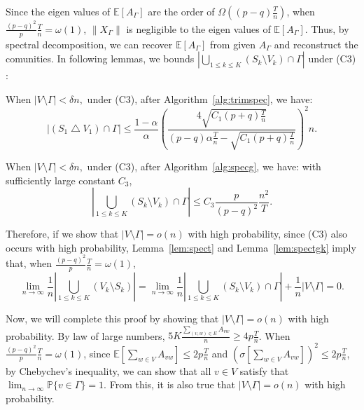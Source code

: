 Since the eigen values of
$\mathbb{E}[A_{\Gamma}]$ are the order of $\Omega((p-q)\frac{T}{n})$,
when $\frac{(p-q)^2}{p}\frac{T}{n}= \omega(1)$, $\|X_{\Gamma} \|$ is
negligible to the eigen values of $\mathbb{E}[A_{\Gamma}]$. Thus, by
spectral decomposition, we can recover $\mathbb{E}[A_{\Gamma}]$ from
given $A_\Gamma$ and reconstruct the comunities. In following lemmas, we bounds $|\bigcup_{1\le k \le K}(S_k \setminus
V_k)\cap \Gamma|$ under (C3) :  
\begin{lemma} When $|V \setminus \Gamma | < \delta n ,$ under (C3), after Algorithm~\ref{alg:trimspec}, we have:
$$
|(S_1 \bigtriangleup V_1)\cap \Gamma|  \le   \frac{1-\alpha}{\alpha}\left(\frac{4\sqrt{C_1 (p+q)\frac{T}{n}}}{(p-q)\alpha\frac{T}{n} - \sqrt{C_1 (p+q)\frac{T}{n}}}\right)^2 n.
$$
\label{lem:spect}
\end{lemma}
\begin{lemma} 
When $|V \setminus \Gamma | < \delta n ,$ under (C3), after
Algorithm~\ref{alg:specg}, we have: with sufficiently large constant $C_3$,
$$
|\bigcup_{1\le k \le K}(S_k \setminus V_k)\cap \Gamma|  \le   C_3 \frac{p}{(p-q)^2}\frac{n^2}{T}.
$$ \label{lem:spectgk}
\end{lemma}

Therefore, if we show that $|V\setminus \Gamma| = o(n)$ with high probability, since (C3)
also occurs with high probability, Lemma~\ref{lem:spect} and
Lemma~\ref{lem:spectgk} imply that, when $\frac{(p-
  q)^2}{p}\frac{T}{n} = \omega(1)$,
$$\lim_{n \to \infty} \frac{1}{n}|\bigcup_{1\le k \le K}(V_k \setminus
S_k)| = \lim_{n \to \infty} \frac{1}{n}|\bigcup_{1\le k \le K}(S_k \setminus
V_k)\cap \Gamma| +\frac{1}{n}|V \setminus \Gamma| = 0.$$

Now, we will complete this proof by showing that $|V\setminus \Gamma|
= o(n)$ with high probability. By law of large numbers, $5K
\frac{\sum_{(v,w) \in E } A_{vw}}{n} \ge 4 p\frac{T}{n}$. When  $\frac{(p-
  q)^2}{p}\frac{T}{n} = \omega(1)$, since $\mathbb{E}[\sum_{w\in V}A_{vw}] \le 2p\frac{T}{n}$
and $(\sigma[\sum_{w\in V} A_{vw}])^2 \le 2p\frac{T}{n}$, by Chebychev's
inequality, we can show that all $v\in V$  satisfy that
$\lim_{n\to \infty}\mathbb{P}\{ v\in \Gamma\} = 1$. From this, it is
also true that $|V\setminus \Gamma|
= o(n)$ with high probability.

